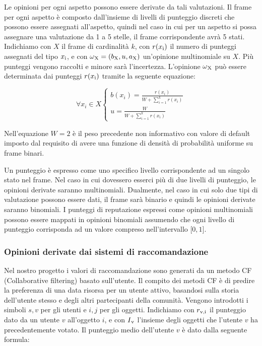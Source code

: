 \documentclass[letterpaper]{article} %
\begin{document}
Le opinioni per ogni aspetto possono essere derivate da tali
valutazioni. Il frame per ogni aspetto è composto dall'insieme di
livelli di punteggio discreti che possono essere assegnati all'aspetto,
quindi nel caso in cui per un aspetto si possa assegnare una valutazione
da 1 a 5 stelle, il frame corrispondente avrà 5 stati. Indichiamo con $X$
il frame di cardinalità $k$, con $r(x\textsubscript{i})$ il numero di punteggi assegnati del
tipo $x\textsubscript{i}$, e con $\omega\textsubscript{X} =(b\textsubscript{X},u,a\textsubscript{X})$ un'opinione multinomiale su $X$. Più punteggi
vengono raccolti e minore sarà l'incertezza. L'opinione $\omega\textsubscript{X}$ può
essere determinata dai punteggi $r(x\textsubscript{i})$ tramite la seguente equazione:

\begin{center}
	\begin{equation}
	\forall x_i \in X \begin{cases}
	b(x_i)=\frac{r(x_i)}{W+\sum_{i=1}^k r(x_i)}\\
	u=\frac{W}{W+\sum_{i=1}^k r(x_i)}
	\end{cases}
	\label{equazione5}
	\end{equation}
\end{center}



Nell'equazione $W = 2$ è il peso precedente non informativo con valore di
default imposto dal requisito di avere una funzione di densità di
probabilità uniforme su frame binari.

Un punteggio è espresso come uno specifico livello corrispondente ad un
singolo stato nel frame. Nel caso in cui dovessero esserci più di due
livelli di punteggio, le opinioni derivate saranno multinomiali. Dualmente,
nel caso in cui solo due tipi di valutazione possono essere dati, il
frame sarà binario e quindi le opinioni derivate saranno binomiali. I punteggi
di reputazione espressi come opinioni multinomiali possono essere
mappati in opinioni binomiali assumendo che ogni livello di punteggio
corrisponda ad un valore compreso nell'intervallo ${[}0,1{]}$.

\subsubsection{Opinioni derivate dai sistemi di raccomandazione}

Nel nostro progetto i valori di raccomandazione sono generati da un
metodo CF (Collaborative filtering) basato sull'utente. Il compito dei
metodi CF è di predire la preferenza di una data risorsa per un utente
attivo, basandosi sulla storia dell'utente stesso e degli altri
partecipanti della comunità. Vengono introdotti i simboli $s,v$ per gli
utenti e $i,j$ per gli oggetti. Indichiamo con $r\textsubscript{v,i}$ il punteggio dato da
un utente $v$ all'oggetto $i$, e con $I\textsubscript{v}$ l'insieme degli oggetti che l'utente
$v$ ha precedentemente votato. Il punteggio medio dell'utente $v$ è dato
dalla seguente formula:
\end{document}
